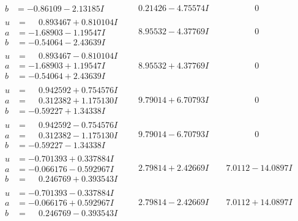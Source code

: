 \documentclass[1p]{elsarticle_modified}
\theoremstyle{definition}
\begin{document}
$$\begin{array}{c|c|c}
\begin{aligned}
b &= -0.86109 - 2.13185 I\end{aligned}
 & \phantom{-}0.21426 - 4.75574 I & \phantom{-0.000000 } 0 \\ \hline\begin{aligned}
u &= \phantom{-}0.893467 + 0.810104 I \\
a &= -1.68903 - 1.19547 I \\
b &= -0.54064 - 2.43639 I\end{aligned}
 & \phantom{-}8.95532 - 4.37769 I & \phantom{-0.000000 } 0 \\ \hline\begin{aligned}
u &= \phantom{-}0.893467 - 0.810104 I \\
a &= -1.68903 + 1.19547 I \\
b &= -0.54064 + 2.43639 I\end{aligned}
 & \phantom{-}8.95532 + 4.37769 I & \phantom{-0.000000 } 0 \\ \hline\begin{aligned}
u &= \phantom{-}0.942592 + 0.754576 I \\
a &= \phantom{-}0.312382 + 1.175130 I \\
b &= -0.59227 + 1.34338 I\end{aligned}
 & \phantom{-}9.79014 + 6.70793 I & \phantom{-0.000000 } 0 \\ \hline\begin{aligned}
u &= \phantom{-}0.942592 - 0.754576 I \\
a &= \phantom{-}0.312382 - 1.175130 I \\
b &= -0.59227 - 1.34338 I\end{aligned}
 & \phantom{-}9.79014 - 6.70793 I & \phantom{-0.000000 } 0 \\ \hline\begin{aligned}
u &= -0.701393 + 0.337884 I \\
a &= -0.066176 - 0.592967 I \\
b &= \phantom{-}0.246769 + 0.393543 I\end{aligned}
 & \phantom{-}2.79814 + 2.42669 I & \phantom{-}7.0112 - 14.0897 I \\ \hline\begin{aligned}
u &= -0.701393 - 0.337884 I \\
a &= -0.066176 + 0.592967 I \\
b &= \phantom{-}0.246769 - 0.393543 I\end{aligned}
 & \phantom{-}2.79814 - 2.42669 I & \phantom{-}7.0112 + 14.0897 I \\ \hline\begin{aligned}

\end{aligned}
\end{array}$$
\end{document}

